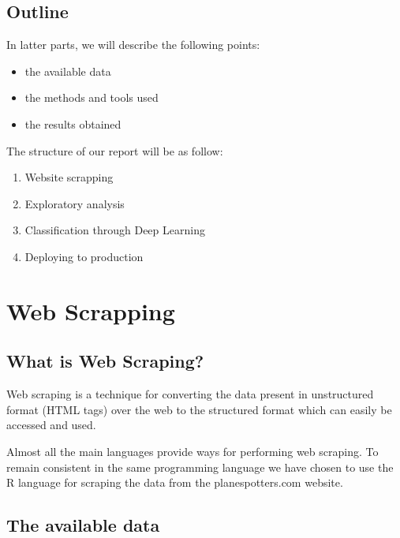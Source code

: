 \documentclass[]{book}
\providecommand{\tightlist}{%
  \setlength{\itemsep}{0pt}\setlength{\parskip}{0pt}}
\begin{document}
\hypertarget{outline}{%
\section{Outline}\label{outline}}

In latter parts, we will describe the following points:

\begin{itemize}
\tightlist
\item
  the available data
\item
  the methods and tools used
\item
  the results obtained
\end{itemize}

The structure of our report will be as follow:

\begin{enumerate}
\def\labelenumi{\arabic{enumi}.}
\tightlist
\item
  Website scrapping
\item
  Exploratory analysis
\item
  Classification through Deep Learning
\item
  Deploying to production
\end{enumerate}

\hypertarget{web-scrapping}{%
\chapter{Web Scrapping}\label{web-scrapping}}

\hypertarget{what-is-web-scraping}{%
\section{What is Web Scraping?}\label{what-is-web-scraping}}

Web scraping is a technique for converting the data present in unstructured format (HTML tags) over the web to the structured format which can easily be accessed and used.

Almost all the main languages provide ways for performing web scraping. To remain consistent in the same programming language we have chosen to use the R language for scraping the data from the planespotters.com website.

\hypertarget{the-available-data}{%
\section{The available data}\label{the-available-data}}
\end{document}
